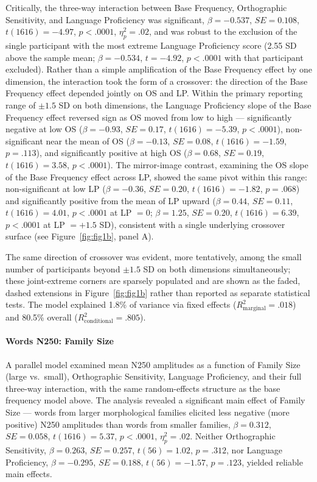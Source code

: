 \documentclass[utf8]{FrontiersinHarvard} %
\begin{document}
	Critically, the three-way interaction between Base Frequency, Orthographic Sensitivity, and Language Proficiency was significant, $\beta = -0.537$, $SE = 0.108$, $t(1616) = -4.97$, $p < .0001$, $\eta^2_p = .02$, and was robust to the exclusion of the single participant with the most extreme Language Proficiency score (2.55 SD above the sample mean; $\beta = -0.534$, $t = -4.92$, $p < .0001$ with that participant excluded). Rather than a simple amplification of the Base Frequency effect by one dimension, the interaction took the form of a crossover: the direction of the Base Frequency effect depended jointly on OS and LP. Within the primary reporting range of $\pm 1.5$ SD on both dimensions, the Language Proficiency slope of the Base Frequency effect reversed sign as OS moved from low to high --- significantly negative at low OS ($\beta = -0.93$, $SE = 0.17$, $t(1616) = -5.39$, $p < .0001$), non-significant near the mean of OS ($\beta = -0.13$, $SE = 0.08$, $t(1616) = -1.59$, $p = .113$), and significantly positive at high OS ($\beta = 0.68$, $SE = 0.19$, $t(1616) = 3.58$, $p < .0001$). The mirror-image contrast, examining the OS slope of the Base Frequency effect across LP, showed the same pivot within this range: non-significant at low LP ($\beta = -0.36$, $SE = 0.20$, $t(1616) = -1.82$, $p = .068$) and significantly positive from the mean of LP upward ($\beta = 0.44$, $SE = 0.11$, $t(1616) = 4.01$, $p < .0001$ at LP $= 0$; $\beta = 1.25$, $SE = 0.20$, $t(1616) = 6.39$, $p < .0001$ at LP $= +1.5$ SD), consistent with a single underlying crossover surface (see Figure~\ref{fig:fig1b}, panel A).

	The same direction of crossover was evident, more tentatively, among the small number of participants beyond $\pm 1.5$ SD on both dimensions simultaneously; these joint-extreme corners are sparsely populated and are shown as the faded, dashed extensions in Figure~\ref{fig:fig1b} rather than reported as separate statistical tests. The model explained 1.8\% of variance via fixed effects ($R^2_{\mathrm{marginal}} = .018$) and 80.5\% overall ($R^2_{\mathrm{conditional}} = .805$).

	\paragraph*{Words N250: Family Size}
	A parallel model examined mean N250 amplitudes as a function of Family Size (large vs.\ small), Orthographic Sensitivity, Language Proficiency, and their full three-way interaction, with the same random-effects structure as the base frequency model above. The analysis revealed a significant main effect of Family Size --- words from larger morphological families elicited less negative (more positive) N250 amplitudes than words from smaller families, $\beta = 0.312$, $SE = 0.058$, $t(1616) = 5.37$, $p < .0001$, $\eta^2_p = .02$. Neither Orthographic Sensitivity, $\beta = 0.263$, $SE = 0.257$, $t(56) = 1.02$, $p = .312$, nor Language Proficiency, $\beta = -0.295$, $SE = 0.188$, $t(56) = -1.57$, $p = .123$, yielded reliable main effects.
\end{document}
